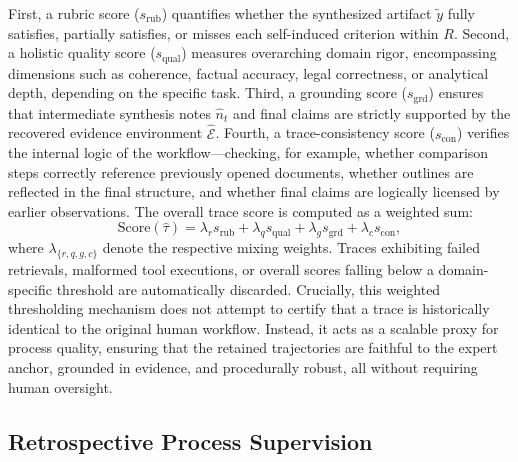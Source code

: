 First, a rubric score ($s_{\mathrm{rub}}$) quantifies whether the synthesized artifact $\tilde{y}$ fully satisfies, partially satisfies, or misses each self-induced criterion within $R$.
Second, a holistic quality score ($s_{\mathrm{qual}}$) measures overarching domain rigor, encompassing dimensions such as coherence, factual accuracy, legal correctness, or analytical depth, depending on the specific task.
Third, a grounding score ($s_{\mathrm{grd}}$) ensures that intermediate synthesis notes $\hat{n}_t$ and final claims are strictly supported by the recovered evidence environment $\hat{\mathcal{E}}$.
Fourth, a trace-consistency score ($s_{\mathrm{con}}$) verifies the internal logic of the workflow—checking, for example, whether comparison steps correctly reference previously opened documents, whether outlines are reflected in the final structure, and whether final claims are logically licensed by earlier observations.
The overall trace score is computed as a weighted sum:
\begin{equation}
    \mathrm{Score}(\hat{\tau})=\lambda_r s_{\mathrm{rub}}+\lambda_q s_{\mathrm{qual}}+\lambda_g s_{\mathrm{grd}}+\lambda_c s_{\mathrm{con}},\end{equation} where $\lambda_{\{r,q,g,c\}}$ denote the respective mixing weights. Traces exhibiting failed retrievals, malformed tool executions, or overall scores falling below a domain-specific threshold are automatically discarded.
    Crucially, this weighted thresholding mechanism does not attempt to certify that a trace is historically identical to the original human workflow. Instead, it acts as a scalable proxy for process quality, ensuring that the retained trajectories are faithful to the expert anchor, grounded in evidence, and procedurally robust, all without requiring human oversight.


\subsection{Retrospective Process Supervision}

